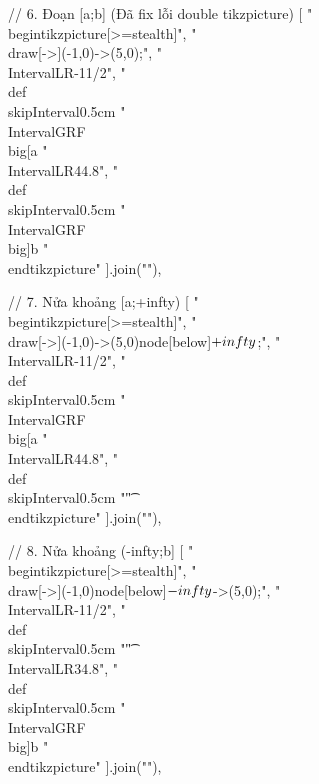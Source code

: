 // 6. Đoạn [a;b] (Đã fix lỗi double tikzpicture)
[
"\\begin{tikzpicture}[>=stealth]",
"\t\\draw[->](-1,0)->(5,0);",
"\t\\IntervalLR{-1}{1/2}",
"\t\\def\\skipInterval{0.5cm}%
"\t\\IntervalGRF{}{}{\\big[}{a}%
"\t\\IntervalLR{4}{4.8}",
"\t\\def\\skipInterval{0.5cm}%
"\t\\IntervalGRF{\\big]}{b}{}{}%
"\\end{tikzpicture}"
].join("\n"),

// 7. Nửa khoảng [a;+infty)
[
"\\begin{tikzpicture}[>=stealth]",
"\t\\draw[->](-1,0)->(5,0)node[below]{$+\\infty$};",
"\t\\IntervalLR{-1}{1/2}",
"\t\\def\\skipInterval{0.5cm}%
"\t\\IntervalGRF{}{}{\\big[}{a}%
"\t\\IntervalLR{4}{4.8}",
"\t\\def\\skipInterval{0.5cm}%
"\t%
"\\end{tikzpicture}"
].join("\n"),

// 8. Nửa khoảng (-infty;b]
[
"\\begin{tikzpicture}[>=stealth]",
"\t\\draw[->](-1,0)node[below]{$-\\infty$}->(5,0);",
"\t\\IntervalLR{-1}{1/2}",
"\t\\def\\skipInterval{0.5cm}%
"\t%
"\t\\IntervalLR{3}{4.8}",
"\t\\def\\skipInterval{0.5cm}%
"\t\\IntervalGRF{\\big]}{b}{}{}%
"\\end{tikzpicture}"
].join("\n"),

